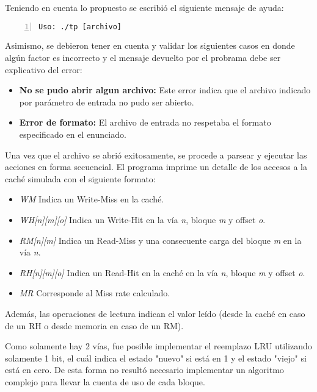 \documentclass[11pt,a4paper]{article}
\begin{document}
Teniendo en cuenta lo propuesto se escribi\'o el siguiente mensaje de ayuda:

\begin{lstlisting}[numbers=left, tabsize=2, basicstyle=\fontsize{11}{13}\ttfamily, frame=single, caption={Mensaje de ayuda del programa}]
Uso: ./tp [archivo]
\end{lstlisting}

Asimismo, se debieron tener en cuenta y validar los siguientes casos en donde alg\'un factor es incorrecto y el mensaje devuelto por el probrama debe ser explicativo del error:

\begin{itemize}
\item \textbf{No se pudo abrir algun archivo:} Este error indica que el archivo indicado por parámetro de entrada no pudo ser abierto.
\item \textbf{Error de formato:} El archivo de entrada no respetaba el formato especificado en el enunciado.
\end{itemize}

Una vez que el archivo se abrió exitosamente, se procede a parsear y ejecutar las acciones en forma secuencial.
El programa imprime un detalle de los accesos a la caché simulada con el siguiente formato:

\begin{itemize}
\item \textit{WM} Indica un Write-Miss en la caché.
\item \textit{WH[n][m][o]} Indica un Write-Hit en la vía \textit{n}, bloque \textit{m} y offset \textit{o}.
\item \textit{RM[n][m]} Indica un Read-Miss y una consecuente carga del bloque \textit{m} en la vía \textit{n}.
\item \textit{RH[n][m][o]} Indica un Read-Hit en la caché en la vía \textit{n}, bloque \textit{m} y offset \textit{o}.
\item \textit{MR} Corresponde al Miss rate calculado.
\end{itemize}

Además, las operaciones de lectura indican el valor leído (desde la caché en caso de un RH o desde memoria en caso de un RM).

Como solamente hay 2 vías, fue posible implementar el reemplazo LRU utilizando solamente 1 bit, el cuál indica
el estado "nuevo" si está en 1 y el estado "viejo" si está en cero. De esta forma no resultó necesario implementar
un algoritmo complejo para llevar la cuenta de uso de cada bloque.
\end{document}
